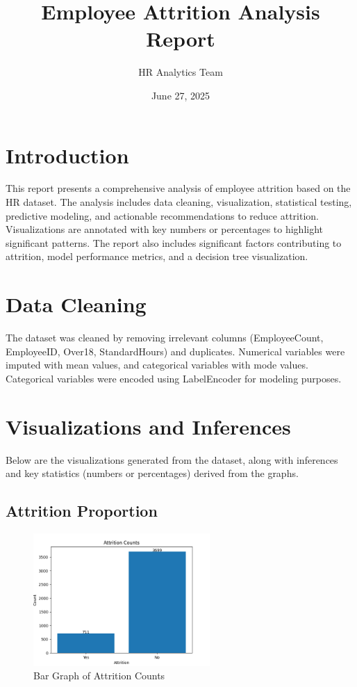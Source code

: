 \documentclass[12pt, a4paper]{article}
\title{Employee Attrition Analysis Report}
\author{HR Analytics Team}
\date{June 27, 2025}
\begin{document}
\maketitle

\tableofcontents
\newpage

\section{Introduction}
This report presents a comprehensive analysis of employee attrition based on the HR dataset. The analysis includes data cleaning, visualization, statistical testing, predictive modeling, and actionable recommendations to reduce attrition. Visualizations are annotated with key numbers or percentages to highlight significant patterns. The report also includes significant factors contributing to attrition, model performance metrics, and a decision tree visualization.

\section{Data Cleaning}
The dataset was cleaned by removing irrelevant columns (EmployeeCount, EmployeeID, Over18, StandardHours) and duplicates. Numerical variables were imputed with mean values, and categorical variables with mode values. Categorical variables were encoded using LabelEncoder for modeling purposes.

\section{Visualizations and Inferences}
Below are the visualizations generated from the dataset, along with inferences and key statistics (numbers or percentages) derived from the graphs.

\subsection{Attrition Proportion}
\begin{figure}[H]
    \centering
    \includegraphics[width=0.6\textwidth]{plots/attrition_bar.png}
    \caption{Bar Graph of Attrition Counts}
    \label{fig:attrition_bar}
\end{figure}
\end{document}

